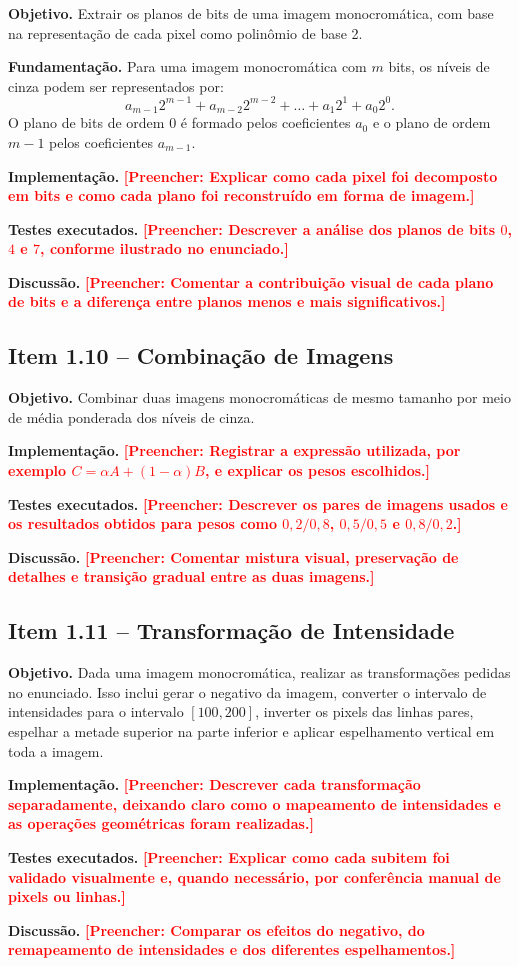 \documentclass[12pt,a4paper]{article}
\newcommand{\placeholder}[1]{\textcolor{red}{\textbf{[Preencher: #1]}}}
\newcommand{\campo}[2]{\textbf{#1.} #2\par}
\begin{document}
\campo{Objetivo}{Extrair os planos de bits de uma imagem monocromática, com base na representação de cada pixel como polinômio de base 2.}
\campo{Fundamentação}{Para uma imagem monocromática com $m$ bits, os níveis de cinza podem ser representados por:
\[
  a_{m-1}2^{m-1} + a_{m-2}2^{m-2} + \ldots + a_1 2^1 + a_0 2^0.
\]
O plano de bits de ordem $0$ é formado pelos coeficientes $a_0$ e o plano de ordem $m-1$ pelos coeficientes $a_{m-1}$.}
\campo{Implementação}{\placeholder{Explicar como cada pixel foi decomposto em bits e como cada plano foi reconstruído em forma de imagem.}}
\campo{Testes executados}{\placeholder{Descrever a análise dos planos de bits $0$, $4$ e $7$, conforme ilustrado no enunciado.}}
\campo{Discussão}{\placeholder{Comentar a contribuição visual de cada plano de bits e a diferença entre planos menos e mais significativos.}}

\subsection{Item 1.10 -- Combinação de Imagens}

\campo{Objetivo}{Combinar duas imagens monocromáticas de mesmo tamanho por meio de média ponderada dos níveis de cinza.}
\campo{Implementação}{\placeholder{Registrar a expressão utilizada, por exemplo $C = \alpha A + (1-\alpha)B$, e explicar os pesos escolhidos.}}
\campo{Testes executados}{\placeholder{Descrever os pares de imagens usados e os resultados obtidos para pesos como $0{,}2/0{,}8$, $0{,}5/0{,}5$ e $0{,}8/0{,}2$.}}
\campo{Discussão}{\placeholder{Comentar mistura visual, preservação de detalhes e transição gradual entre as duas imagens.}}

\subsection{Item 1.11 -- Transformação de Intensidade}

\campo{Objetivo}{Dada uma imagem monocromática, realizar as transformações pedidas no enunciado. Isso inclui gerar o negativo da imagem, converter o intervalo de intensidades para o intervalo $[100,200]$, inverter os pixels das linhas pares, espelhar a metade superior na parte inferior e aplicar espelhamento vertical em toda a imagem.}
\campo{Implementação}{\placeholder{Descrever cada transformação separadamente, deixando claro como o mapeamento de intensidades e as operações geométricas foram realizadas.}}
\campo{Testes executados}{\placeholder{Explicar como cada subitem foi validado visualmente e, quando necessário, por conferência manual de pixels ou linhas.}}
\campo{Discussão}{\placeholder{Comparar os efeitos do negativo, do remapeamento de intensidades e dos diferentes espelhamentos.}}
\end{document}

